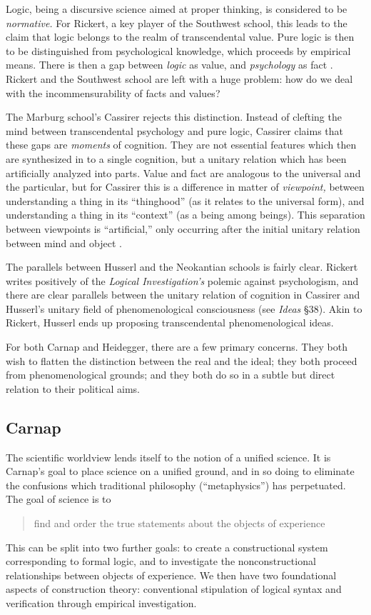 \documentclass[leqno, 12pt]{turabian-researchpaper}
\begin{document}
	Logic, being a discursive science aimed at proper thinking, is considered to
	be \emph{normative.} For Rickert, a key player of the Southwest school, this leads
	to the claim that logic belongs to the realm of transcendental value. Pure
	logic is then to be distinguished from psychological knowledge, which proceeds
	by empirical means. There is then a gap between \emph{logic} as value, and
	\emph{psychology} as fact \autocite[p34f]{friedman2000}. Rickert and the
	Southwest school are left with a huge problem: how do we deal with the incommensurability
	of facts and values?

	The Marburg school's Cassirer rejects this distinction. Instead of clefting
	the mind between transcendental psychology and pure logic, Cassirer claims that
	these gaps are \emph{moments} of cognition. They are not essential features which
	then are synthesized in to a single cognition, but a unitary relation which
	has been artificially analyzed into parts. Value and fact are analogous to the
	universal and the particular, but for Cassirer this is a difference in matter
	of \emph{viewpoint,} between understanding a thing in its \enquote{thinghood}
	(as it relates to the universal form), and understanding a thing in its \enquote{context}
	(as a being among beings). This separation between viewpoints is \enquote{artificial,}
	only occurring after the initial unitary relation between mind and object
	\autocite[p34f]{friedman2000}.

	The parallels between Husserl and the Neokantian schools is fairly clear. Rickert
	writes positively of the \textit{Logical Investigation's}\nocite{husserl2005}
	polemic against psychologism, and there are clear parallels between the unitary
	relation of cognition in Cassirer and Husserl's unitary field of phenomenological
	consciousness (see \textit{Ideas} \S38)\nocite{husserl2012}. Akin to Rickert, Husserl
	ends up proposing transcendental phenomenological ideas.

	For both Carnap and Heidegger, there are a few primary concerns. They both wish
	to flatten the distinction between the real and the ideal; they both proceed
	from phenomenological grounds; and they both do so in a subtle but direct relation
	to their political aims.

	\subsection{Carnap}

	The scientific worldview lends itself to the notion of a unified science. It is
	Carnap's goal to place science on a unified ground, and in so doing to
	eliminate the confusions which traditional philosophy (\enquote{metaphysics}) has
	perpetuated. The goal of science is to \blockquote[{}]{find and order the true statements about the objects of experience}.
	This can be split into two further goals: to create a constructional system
	corresponding to formal logic, and to investigate the nonconstructional relationships
	between objects of experience. We then have two foundational aspects of
	construction theory: conventional stipulation of logical syntax and verification
	through empirical investigation.
\end{document}
